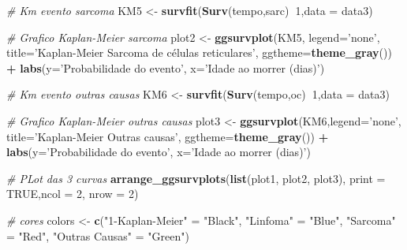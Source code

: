 \documentclass[]{article}
\newenvironment{Shaded}{\begin{snugshade}}{\end{snugshade}}
\newcommand{\KeywordTok}[1]{\textcolor[rgb]{0.13,0.29,0.53}{\textbf{#1}}}
\newcommand{\DataTypeTok}[1]{\textcolor[rgb]{0.13,0.29,0.53}{#1}}
\newcommand{\DecValTok}[1]{\textcolor[rgb]{0.00,0.00,0.81}{#1}}
\newcommand{\StringTok}[1]{\textcolor[rgb]{0.31,0.60,0.02}{#1}}
\newcommand{\CommentTok}[1]{\textcolor[rgb]{0.56,0.35,0.01}{\textit{#1}}}
\newcommand{\OtherTok}[1]{\textcolor[rgb]{0.56,0.35,0.01}{#1}}
\newcommand{\OperatorTok}[1]{\textcolor[rgb]{0.81,0.36,0.00}{\textbf{#1}}}
\newcommand{\NormalTok}[1]{#1}
\begin{document}
\begin{Shaded}
\begin{Highlighting}[]
\CommentTok{# Km evento sarcoma}
\NormalTok{KM5 <-}\StringTok{ }\KeywordTok{survfit}\NormalTok{(}\KeywordTok{Surv}\NormalTok{(tempo,sarc)}\OperatorTok{~}\DecValTok{1}\NormalTok{,}\DataTypeTok{data =}\NormalTok{ data3)}

\CommentTok{# Grafico Kaplan-Meier sarcoma}
\NormalTok{plot2 <-}\StringTok{ }\KeywordTok{ggsurvplot}\NormalTok{(KM5, }\DataTypeTok{legend=}\StringTok{'none'}\NormalTok{,}
                    \DataTypeTok{title=}\StringTok{'Kaplan-Meier Sarcoma de células reticulares'}\NormalTok{,}
                    \DataTypeTok{ggtheme=}\KeywordTok{theme_gray}\NormalTok{()) }\OperatorTok{+}
\StringTok{                    }\KeywordTok{labs}\NormalTok{(}\DataTypeTok{y=}\StringTok{'Probabilidade do evento'}\NormalTok{,}
                         \DataTypeTok{x=}\StringTok{'Idade ao morrer (dias)'}\NormalTok{)}

\CommentTok{# Km evento outras causas}
\NormalTok{KM6 <-}\StringTok{ }\KeywordTok{survfit}\NormalTok{(}\KeywordTok{Surv}\NormalTok{(tempo,oc)}\OperatorTok{~}\DecValTok{1}\NormalTok{,}\DataTypeTok{data =}\NormalTok{ data3)}

\CommentTok{# Grafico Kaplan-Meier outras causas}
\NormalTok{plot3 <-}\StringTok{ }\KeywordTok{ggsurvplot}\NormalTok{(KM6,}\DataTypeTok{legend=}\StringTok{'none'}\NormalTok{, }
                    \DataTypeTok{title=}\StringTok{'Kaplan-Meier Outras causas'}\NormalTok{,}
                    \DataTypeTok{ggtheme=}\KeywordTok{theme_gray}\NormalTok{()) }\OperatorTok{+}\StringTok{ }
\StringTok{                    }\KeywordTok{labs}\NormalTok{(}\DataTypeTok{y=}\StringTok{'Probabilidade do evento'}\NormalTok{,}
                         \DataTypeTok{x=}\StringTok{'Idade ao morrer (dias)'}\NormalTok{)}

\CommentTok{# PLot das 3 curvas}
\KeywordTok{arrange_ggsurvplots}\NormalTok{(}\KeywordTok{list}\NormalTok{(plot1, plot2, plot3), }
                    \DataTypeTok{print =} \OtherTok{TRUE}\NormalTok{,}\DataTypeTok{ncol =} \DecValTok{2}\NormalTok{, }\DataTypeTok{nrow =} \DecValTok{2}\NormalTok{)}

\CommentTok{# cores}
\NormalTok{colors <-}\StringTok{ }\KeywordTok{c}\NormalTok{(}\StringTok{"1-Kaplan-Meier"}\NormalTok{ =}\StringTok{ "Black"}\NormalTok{,}
            \StringTok{"Linfoma"}\NormalTok{ =}\StringTok{ "Blue"}\NormalTok{,}
            \StringTok{"Sarcoma"}\NormalTok{ =}\StringTok{ "Red"}\NormalTok{,}
            \StringTok{"Outras Causas"}\NormalTok{ =}\StringTok{ "Green"}\NormalTok{)}


\end{Highlighting}
\end{Shaded}
\end{document}
